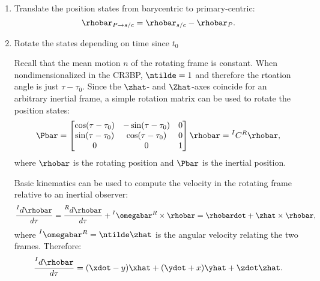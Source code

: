 \begin{enumerate}
    \item   Translate the position states from barycentric to primary-centric:
            \begin{equation}
                \rhobar_{P\rightarrow s/c}=\rhobar_{s/c}-\rhobar_{P}.
                \label{eq:translation}
            \end{equation}
    \item   Rotate the states depending on time since $t_{0}$
    
            Recall that the mean motion $n$ of the rotating frame is constant. When
            nondimensionalized in the CR3BP, $\ntilde=1$ and therefore the rtoation angle is just
            $\tau-\tau_{0}$. Since the $\zhat$- and $\Zhat$-axes coincide for an arbitrary inertial
            frame, a simple rotation matrix can be used to rotate the position states:
            \begin{equation}
                \Pbar=\begin{bmatrix}   \cos(\tau-\tau_{0}) &   -\sin(\tau-\tau_{0})    &   0   \\
                                        \sin(\tau-\tau_{0}) &   \cos(\tau-\tau_{0})     &   0   \\
                                        0                   &   0                       &   1   \end{bmatrix}\rhobar=\prescript{I}{}{C}^{R}\rhobar,
                \label{eq:positionrotation}
            \end{equation}
            where $\rhobar$ is the rotating position and $\Pbar$ is the inertial position.

            Basic kinematics can be used to compute the velocity in the rotating frame relative to
            an inertial observer:
            \begin{equation}
                \frac{\prescript{I}{}{d\rhobar}}{d\tau}=\frac{\prescript{R}{}{d\rhobar}}{d\tau}+\prescript{I}{}{\omegabar}^{R}\times\rhobar=\rhobardot+\zhat\times\rhobar,
                \label{eq:BKE}
            \end{equation}
            where $\prescript{I}{}{\omegabar}^{R}=\ntilde\zhat$ is the angular velocity relating
            the two frames. Therefore:
            \begin{equation}
                \frac{\prescript{I}{}{d\rhobar}}{d\tau}=(\xdot-y)\xhat+(\ydot+x)\yhat+\zdot\zhat.
                \label{eq:inertialrotatingvelocity}
            \end{equation}
            

\end{enumerate}

